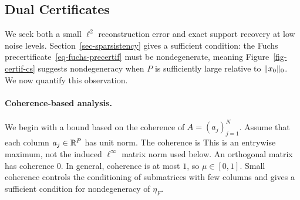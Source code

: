 

\subsection{Dual Certificates}

We seek both a small $\ell^2$ reconstruction error and exact support recovery at low noise levels. Section~\ref{sec-sparsistency} gives a sufficient condition: the Fuchs precertificate~\eqref{eq-fuchs-precertif} must be nondegenerate, meaning
Figure~\ref{fig-certif-cs} suggests nondegeneracy when $P$ is sufficiently large relative to $\lVert x_0\rVert_0$. We now quantify this observation.


\paragraph{Coherence-based analysis.}

We begin with a bound based on the coherence of $A=(a_j)_{j=1}^N$. Assume that each column $a_j\in\mathbb{R}^P$ has unit norm. The coherence is
This is an entrywise maximum, not the induced $\ell^\infty$ matrix norm used below.
%
An orthogonal matrix has coherence $0$. In general, coherence is at most $1$, so $\mu \in [0,1]$.
%
Small coherence controls the conditioning of submatrices with few columns and gives a sufficient condition for nondegeneracy of $\eta_F$.

